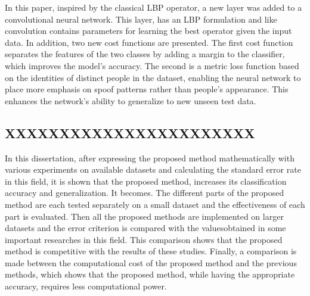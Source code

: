 \documentclass[journal]{IEEEtran}
\begin{document}
In this paper, inspired by the classical LBP operator, a new layer was added to a convolutional neural network.
This layer, has an LBP formulation and like convolution contains parameters for learning the best operator given the input data. In addition, two new cost functions are presented.
The first cost function separates the features of the two classes by adding a margin to the classifier, which improves the model's accuracy. The second is a metric loss function based on the identities of distinct people in the dataset, enabling the neural network to place more emphasis on spoof patterns rather than people's appearance. This enhances the network's ability to generalize to new unseen test data. 
\subsection{XXXXXXXXXXXXXXXXXXXXXXX}
In this dissertation, after expressing the proposed method mathematically with various experiments on available datasets and calculating the standard error rate in this field, it is shown that the proposed method, increases its classification accuracy and generalization. It becomes. The different parts of the proposed method are each tested separately on a small dataset and the effectiveness of each part is evaluated. Then all the proposed methods are implemented on larger datasets and the error criterion is compared with the values ​​obtained in some important researches in this field. This comparison shows that the proposed method is competitive with the results of these studies. Finally, a comparison is made between the computational cost of the proposed method and the previous methods, which shows that the proposed method, while having the appropriate accuracy, requires less computational power.
\end{document}

